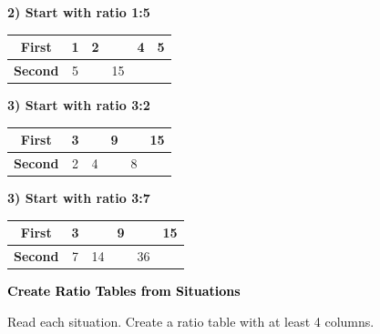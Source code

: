 \documentclass[12pt, letterpaper, fleqn]{article}
\begin{document}
\noindent
\textbf{2) Start with ratio 1:5}

\begin{center}
\begin{tabular}{|c|c|c|c|c|c|}
\hline
\textbf{First} & 1 & 2 & \phantom{00} & 4 & 5 \\
\hline
\textbf{Second} & 5 & \phantom{00} & 15 & \phantom{00} & \phantom{00} \\
\hline
\end{tabular}
\end{center}

\vspace{2cm}

\noindent
\textbf{3) Start with ratio 3:2}

\begin{center}
\begin{tabular}{|c|c|c|c|c|c|}
\hline
\textbf{First} & 3 & \phantom{00} & 9 & \phantom{00} & 15 \\
\hline
\textbf{Second} & 2 & 4 & \phantom{00} & 8 & \phantom{00} \\
\hline
\end{tabular}
\end{center}

\vspace{2cm}

\noindent
\textbf{3) Start with ratio 3:7}

\begin{center}
\begin{tabular}{|c|c|c|c|c|c|}
\hline
\textbf{First} & 3 & \phantom{00} & 9 & \phantom{00} & 15 \\
\hline
\textbf{Second} & 7 & 14 & \phantom{00} & 36 & \phantom{00} \\
\hline
\end{tabular}
\end{center}

\newpage

\begin{tcolorbox}[colback=customteal!20]
\large\textcolor{black}{\textbf{Create Ratio Tables from Situations}}
\end{tcolorbox}

\noindent
Read each situation. Create a ratio table with at least 4 columns.
\end{document}
